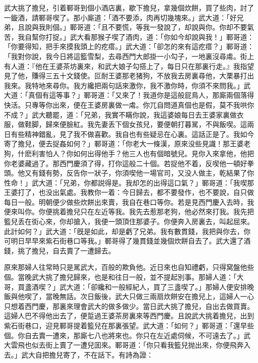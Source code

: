武大挑了擔兒，引着鄆哥到個小酒店裏，歇下擔兒，拿幾個炊餅，買了些肉，討了一鏇酒，請鄆哥喫了。那小廝道：「酒不要添，肉再切幾塊來。」武大道：「好兄弟，且說與我則個。」鄆哥道：「且不要慌，等我一發說了，却說與你。你却不要氣苦，我自幫你打捉。」武大看那猴子喫了酒肉，道：「你如今却說與我！」鄆哥道：「你要得知，把手來摸我頭上的疙瘩。」武大道：「卻怎的來有這疙瘩？」鄆哥道：「我對你說，我今日將這籃雪梨，去尋西門大郎掛一小勾子，一地裏沒尋䖏。街上有人道：『他在王婆茶坊裏來，和武大娘子勾搭上了，每日只在那裏行走。』我指望見了他，賺得三五十文錢使。叵耐王婆那老猪狗，不放我去房裏尋他，大栗暴打出我來。我特地來尋你。我方纔把兩句話來激你，我不激你時，你須不來問我。」武大道：「真個有這等事？」鄆哥道：「又來了！我道你是這般屁鳥人，那廝兩個落得快活。只專等你出來，便在王婆房裏做一䖏。你兀自問道真個也是假，莫不我哄你不成？」武大聽罷，道：「兄弟，我實不瞞你說，我這婆娘每日去王婆家裏做衣服，做鞋脚，歸來便臉紅。我先妻丢下個女孩兒，要便朝打暮駡，不與飯喫。這兩日有些精神錯亂，見了我不做喜歡。我自也有些疑忌在心裏。這話正是了。我如今寄了擔兒，便去捉姦如何？」鄆哥道：「你老大一條漢，原來没些見識！那王婆老狗，什麽利害怕人？你如何出得他手？他三人也有個暗號兒。見你入來拿他，他把你老婆藏過了。那西門慶須了得，打你這般二十個。若捉他不着，反喫他一頓好拳頭。他又有錢有勢，反告你一狀子，你須喫他一場官司，又没人做主，乾結果了你性命！」武大道：「兄弟，你都説得是。我却怎的出得這口氣？」鄆哥道：「我喫那王婆打了，也没出氣處。我教你一着：今日歸去，都不要發作，也不要說，自只做每日一般。明朝便少做些炊餅出來賣，我自在巷口等你。若是見西門慶入去時，我便來叫你。你便挑着擔兒只在左近等我。我先去惹那老狗，他必然來打我。我先把籃兒丢在街心來，你却搶入，我便一頭頂住那婆子。你便奔入房裏去，叫起屈來。此計如何？」武大道：「旣是如此，却是虧了兄弟。我有數貫錢，我把與你去，你可明日早早來紫石街巷口等我。」鄆哥得了幾貫錢並幾個炊餅自去了。武大還了酒錢，挑了擔兒，自去賣了一遭歸去。

原來那婦人往常時只是駡武大，百般的欺負他。近日來也自知禮虧，只得窝盤他些個。當晚武大挑了擔兒歸來，也是和往日一般，並不提起別事。那婦人道：「大哥，買盞酒喫？」武大道：「卻纔和一般經紀人，買了三盞喫了。」那婦人便安排晚飯與他喫了，當晚無話。次日飯後，武大只做三兩扇炊餅安在擔兒上，這婦人一心只想着西門慶，那裏來理會武大的做多做少。當日武大挑了擔兒，自出去做買賣。這婦人巴不得他出去了，便踅過王婆茶房裏來等西門慶。且說武大挑着擔兒，出到紫石街巷口，迎見鄆哥提着籃兒在那裏張望。武大道：「如何？」鄆哥道：「還早些個。你自去賣一遭來，那廝七八也將來也。你只在左近處伺候，不可遠去了。」武大雲飛也似去街上賣了一遭兒囬來。鄆哥道：「你只看我籃兒抛出來，你便飛奔入去。」武大自把擔兒寄了，不在話下。有詩為證：

